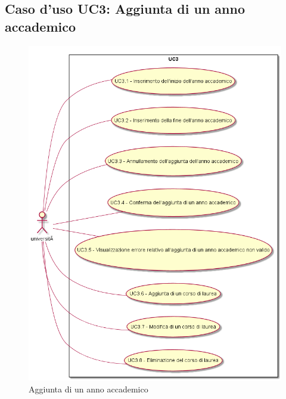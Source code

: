 \subsection{Caso d'uso \texorpdfstring{UC3}{UC3}: Aggiunta di un anno accademico}
\begin{figure} [H]
\centering
\includegraphics[scale=0.45]{./img/UC3.png}
\caption{Aggiunta di un anno accademico}\label{}
\end{figure}
